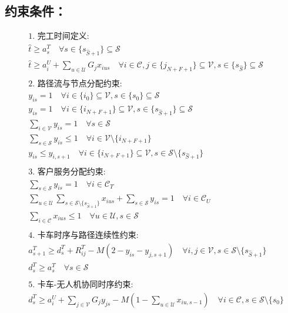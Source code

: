 \documentclass[11pt]{article}
\begin{document}
\subsection*{约束条件：}
\[\begin{aligned}
&\text{1. 完工时间定义:} \\
&\hat{t} \ge a^T_s \quad \forall s \in \{s_{\hat{S}+1}\} \subseteq \mathcal{S} \\
&\hat{t} \ge a^U_i + \sum_{u \in \mathcal{U}} G_j x_{ius} \quad \forall i \in \mathcal{C}, j \in \{j_{N+F+1}\} \subseteq \mathcal{V}, s \in \{s_{\hat{S}}\} \subseteq \mathcal{S} \\
\\
&\text{2. 路径流与节点分配约束:} \\
&y_{is} = 1 \quad \forall i \in \{i_0\} \subseteq \mathcal{V}, s \in \{s_0\} \subseteq \mathcal{S} \\
&y_{is} = 1 \quad \forall i \in \{i_{N+F+1}\} \subseteq \mathcal{V}, s \in \{s_{\hat{S}+1}\} \subseteq \mathcal{S} \\
&\sum_{i \in \mathcal{V}} y_{is} = 1 \quad \forall s \in \mathcal{S} \\
&\sum_{s \in \mathcal{S}} y_{is} \le 1 \quad \forall i \in \mathcal{V} \setminus \{i_{N+F+1}\} \\
&y_{is} \le y_{i,s+1} \quad \forall i \in \{i_{N+F+1}\} \subseteq \mathcal{V}, s \in \mathcal{S} \setminus \{s_{\hat{S}+1}\} \\
\\
&\text{3. 客户服务分配约束:} \\
&\sum_{s \in \mathcal{S}} y_{is} = 1 \quad \forall i \in \mathcal{C}_T \\
&\sum_{u \in \mathcal{U}} \sum_{s \in \mathcal{S} \setminus \{s_{\hat{S}+1}\}} x_{ius} + \sum_{s \in \mathcal{S}} y_{is} = 1 \quad \forall i \in \mathcal{C}_U \\
&\sum_{i \in \mathcal{C}} x_{ius} \le 1 \quad \forall u \in \mathcal{U}, s \in \mathcal{S} \\
\\
&\text{4. 卡车时序与路径连续性约束:} \\
&a^T_{s+1} \ge d^T_s + R^T_{ij} - M(2 - y_{is} - y_{j,s+1}) \quad \forall i, j \in \mathcal{V}, s \in \mathcal{S} \setminus \{s_{\hat{S}+1}\} \\
&d^T_s \ge a^T_s \quad \forall s \in \mathcal{S} \\
\\
&\text{5. 卡车-无人机协同时序约束:} \\
&d^T_s \ge a^U_i + \sum_{j \in \mathcal{V}} G_j y_{js} - M\left(1 - \sum_{u \in \mathcal{U}} x_{iu,s-1}\right) \quad \forall i \in \mathcal{C}, s \in \mathcal{S} \setminus \{s_0\} \\

\end{aligned}\]
\end{document}
